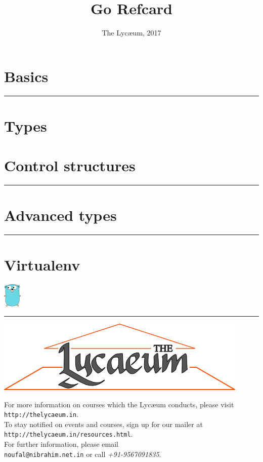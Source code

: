 \documentclass{../refsheet}
\title{Go Refcard}
\author{The Lyc\ae{}um, 2017}
\date{}
\begin{document}
\maketitle
\section{Basics}





\noindent\rule{\linewidth}{0.05ex}
\section{Types}


\section{Control structures}





\noindent\rule{\linewidth}{0.05ex}
\section{Advanced types}





\noindent\rule{\linewidth}{0.05ex}
\section{Virtualenv}
\includegraphics{../images/golang-small.png}

\noindent\rule{\linewidth}{0.05ex}
\begin{center}
\includegraphics[scale=0.4]{../images/parthenon-callig.png}
\end{center}
For more information on courses which the Lyc\ae{}um conducts, please
visit \texttt{http://thelycaeum.in}. \\To stay notified on events and
courses, sign up for our mailer at \texttt{http://thelycaeum.in/resources.html}. \\For further
information, please email \\\texttt{noufal@nibrahim.net.in} or call
\textit{+91-9567091835}.
\vspace{0.5cm}
\end{document}
